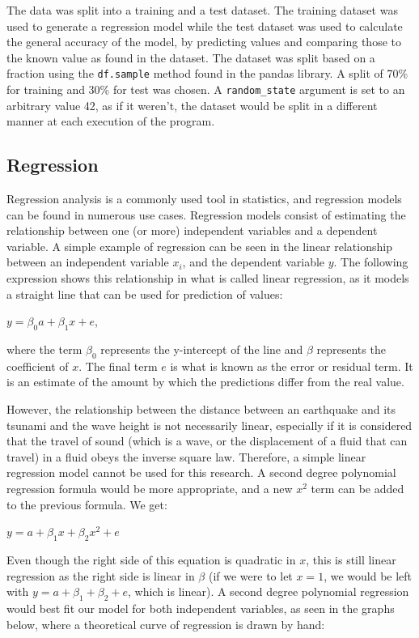 \documentclass[11pt,letterpaper]{article}
\begin{document}
The data was split into a training and a test dataset. The training
dataset was used to generate a regression model while the test dataset was used 
to calculate the general accuracy of the model, by predicting values and
comparing those to the known value as found in the dataset. The dataset was split based on
a fraction using the \verb|df.sample| method found in the pandas library. A split
of 70\% for training and 30\% for test was chosen. A \verb|random_state| argument is
set to an arbitrary value 42, as if it weren't, the dataset would be split in a different
manner at each execution of the program.

\subsection{Regression}

Regression analysis is a commonly used tool in statistics, and regression models can
be found in numerous use cases. Regression models consist of estimating the
relationship between one (or more) independent variables and a dependent variable. A
simple example of regression can be seen in the linear relationship between an independent
variable $x_{i}$, and the dependent variable $y$. The following expression shows this relationship in what is
called linear regression, as it models a straight line that can be used for prediction of 
values:

$y =  \beta_0 a + \beta_1 x + e $,

where the term $\beta_0$ represents the y-intercept of the line and $\beta$ represents the
coefficient of $x$. The final term $e$ is what is known as the error or residual
term. It is an estimate of the amount by which the predictions differ from the real
value.

However, the relationship between the distance between an earthquake and its tsunami 
and the wave height is not necessarily linear, especially if it is considered that the travel of
sound (which is a wave, or the displacement of a fluid that can travel) in a fluid obeys the 
inverse square law. Therefore, a simple linear regression model cannot be 
used for this research. A second degree polynomial regression formula would be more 
appropriate, and a new $x^2$ term can be added to the previous formula. We get:

$y = a + \beta_1 x + \beta_2 x^2 + e$

Even though the right side of this equation is quadratic in $x$, this is still
linear regression as the right side is linear in $\beta$ (if we were to let
$x = 1$, we would be left with $y = a + \beta_1 + \beta_2 + e$, which is linear).
A second degree polynomial regression would best fit our model for both independent
variables, as seen in the graphs below, where a theoretical curve of regression is drawn
by hand:
\end{document}
